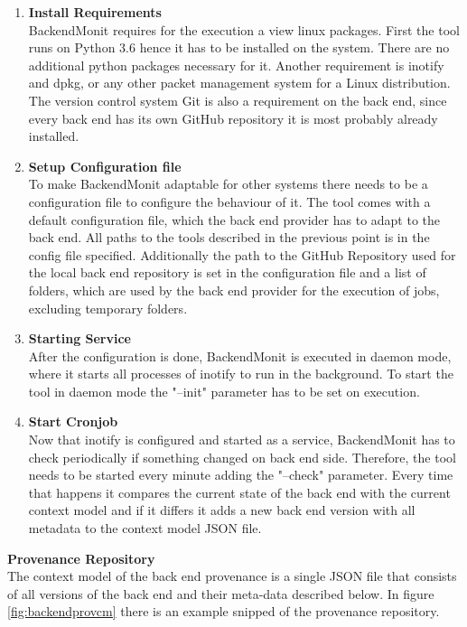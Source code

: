 \documentclass[draft,final]{vutinfth} %
\begin{document}
\begin{enumerate}
	\item \textbf{Install Requirements} \\
	BackendMonit requires for the execution a view linux packages. First the tool runs on Python 3.6 hence it has to be installed on the system. There are no additional python packages necessary for it. Another requirement is inotify and dpkg, or any other packet management system for a Linux distribution. The version control system Git is also a requirement on the back end, since every back end has its own GitHub repository it is most probably already installed. 
	\item \textbf{Setup Configuration file} \\
	To make BackendMonit adaptable for other systems there needs to be a configuration file to configure the behaviour of it. The tool comes with a default configuration file, which the back end provider has to adapt to the back end. All paths to the tools described in the previous point is in the config file specified. Additionally the path to the GitHub Repository used for the local back end repository is set in the configuration file and a list of folders, which are used by the back end provider for the execution of jobs, excluding temporary folders.      
	     
	\item\textbf{Starting Service} \\
	After the configuration is done, BackendMonit is executed in daemon mode, where it starts all processes of inotify to run in the background. To start the tool in daemon mode the "--init" parameter has to be set on execution. 
	
	\item \textbf{Start Cronjob} \\
	Now that inotify is configured and started as a service, BackendMonit has to check periodically if something changed on back end side. Therefore, the tool needs to be started every minute adding the "--check" parameter. Every time that happens it compares the current state of the back end with the current context model and if it differs it adds a new back end version with all metadata to the context model JSON file. 	 
\end{enumerate}

\textbf{Provenance Repository} \\
The context model of the back end provenance is a single JSON file that consists of all versions of the back end and their meta-data described below. In figure \ref{fig:backendprovcm} there is an example snipped of the provenance repository. 
\end{document}
